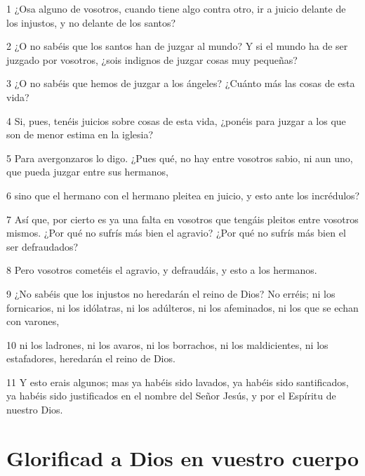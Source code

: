 \par 1 ¿Osa alguno de vosotros, cuando tiene algo contra otro, ir a juicio delante de los injustos, y no delante de los santos?
\par 2 ¿O no sabéis que los santos han de juzgar al mundo? Y si el mundo ha de ser juzgado por vosotros, ¿sois indignos de juzgar cosas muy pequeñas?
\par 3 ¿O no sabéis que hemos de juzgar a los ángeles? ¿Cuánto más las cosas de esta vida?
\par 4 Si, pues, tenéis juicios sobre cosas de esta vida, ¿ponéis para juzgar a los que son de menor estima en la iglesia?
\par 5 Para avergonzaros lo digo. ¿Pues qué, no hay entre vosotros sabio, ni aun uno, que pueda juzgar entre sus hermanos,
\par 6 sino que el hermano con el hermano pleitea en juicio, y esto ante los incrédulos?
\par 7 Así que, por cierto es ya una falta en vosotros que tengáis pleitos entre vosotros mismos. ¿Por qué no sufrís más bien el agravio? ¿Por qué no sufrís más bien el ser defraudados?
\par 8 Pero vosotros cometéis el agravio, y defraudáis, y esto a los hermanos.
\par 9 ¿No sabéis que los injustos no heredarán el reino de Dios? No erréis; ni los fornicarios, ni los idólatras, ni los adúlteros, ni los afeminados, ni los que se echan con varones,
\par 10 ni los ladrones, ni los avaros, ni los borrachos, ni los maldicientes, ni los estafadores, heredarán el reino de Dios.
\par 11 Y esto erais algunos; mas ya habéis sido lavados, ya habéis sido santificados, ya habéis sido justificados en el nombre del Señor Jesús, y por el Espíritu de nuestro Dios.

\section*{Glorificad a Dios en vuestro cuerpo}

